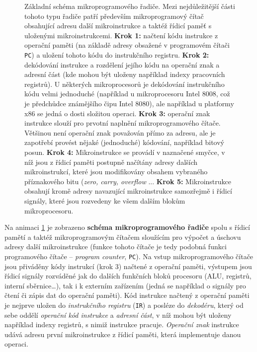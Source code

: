       \begin{figure}[ht!]
        \centering
        \caption{Základní schéma mikroprogramového řadiče. Mezi nejdůležitější části tohoto typu 
                 řadiče patří především mikroprogramový čítač obsahující adresu další 
                 mikroinstrukce a taktéž řídicí paměť s uloženými mikroinstrukcemi. \textbf{Krok 
                 1:} načtení kódu instrukce z operační paměti (na základě adresy obsažené v 
                 programovém čítači \texttt{PC}) a uložení tohoto kódu do instrukčního registru. 
                 \textbf{Krok 2:} dekódování instrukce a rozdělení jejího kódu na 
                 operační znak a adresní část (kde mohou být uloženy například indexy pracovních 
                 registrů). U některých mikroprocesorů je dekódování instrukčního kódu velmi 
                 jednoduché (například u mikroprocesoru Intel 8008, což je předchůdce známějšího 
                 čipu Intel 8080), ale například u platformy x86 se jedná o dosti složitou operaci. 
                 \textbf{Krok 3:} operační znak instrukce slouží pro prvotní naplnění 
                 mikroprogramového čítače. Většinou není operační znak považován přímo za adresu, 
                 ale je zapotřebí provést nějaké (jednoduché) kódování, například bitový posun.
                 \textbf{Krok 4:} Mikroinstrukce se provádí v naznačené smyčce, v níž jsou z řídicí 
                 paměti postupně načítány adresy dalších mikroinstrukcí, které jsou modifikovány 
                 obsahem vybraného příznakového bitu (\emph{zero, carry, overflow} ... \textbf{Krok 
                 5:} Mikroinstrukce obsahují kromě adresy navazující mikroinstrukce samozřejmě i 
                 řídicí signály, které jsou rozvedeny ke všem dalším blokům mikroprocesoru.}
        \label{MIT:anim_mpradic}
      \end{figure}  
       
      Na animaci \ref{MIT:anim_mpradic} je zobrazeno \textbf{schéma mikroprogramového řadiče} spolu 
      s řídicí pamětí a taktéž mikroprogramovým čítačem sloužícím pro výpočet a úschovu adresy 
      další mikroinstrukce (funkce tohoto čítače je tedy podobná funkci programového čítače – 
      \emph{program counter}, \texttt{PC}). Na vstup mikroprogramového čítače jsou přiváděny kódy 
      instrukcí (krok 3) načtené z operační paměti, výstupem jsou řídicí signály rozváděné jak do 
      dalších funkčních bloků procesoru (ALU, registrů, interní sběrnice…), tak i k externím 
      zařízením (jedná se například o signály pro čtení či zápis dat do operační paměti). Kód 
      instrukce načtený z operační paměti je nejprve uložen do \emph{instrukčního registru} 
      (\texttt{IR}) a posléze do \emph{dekodéru}, který od sebe oddělí \emph{operační kód 
      instrukce} a \emph{adresní část}, v níž mohou být uloženy například indexy registrů, s nimiž 
      instrukce pracuje. \emph{Operační znak} instrukce udává adresu první mikroinstrukce z řídicí 
      paměti, která implementuje danou operaci.
      

